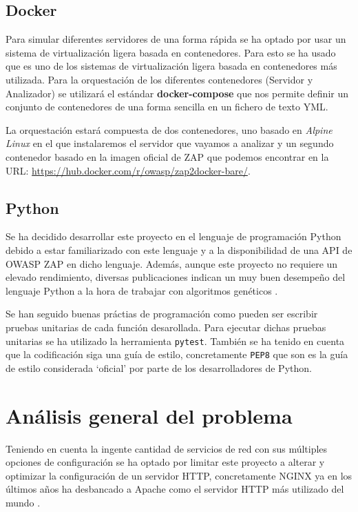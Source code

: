 \subsection{Docker}

Para simular diferentes servidores de una forma rápida se ha optado por usar un sistema de virtualización ligera basada en contenedores. Para esto se ha usado  que es uno de los sistemas de virtualización ligera basada en contenedores más utilizada. Para la orquestación de los diferentes contenedores (Servidor y Analizador) se utilizará el estándar \textbf{docker-compose} que nos permite definir un conjunto de contenedores de una forma sencilla en un fichero de texto YML.

\bigskip
La orquestación estará compuesta de dos contenedores, uno basado en \textit{Alpine Linux} en el que instalaremos el servidor que vayamos a analizar y un segundo contenedor basado en la imagen oficial de ZAP que podemos encontrar en la URL: \url{https://hub.docker.com/r/owasp/zap2docker-bare/}.

\subsection{Python}

Se ha decidido desarrollar este proyecto en el lenguaje de programación Python debido a estar familiarizado con este lenguaje y a la disponibilidad de una API de OWASP ZAP en dicho lenguaje. Además, aunque este proyecto no requiere un elevado rendimiento, diversas publicaciones indican un muy buen desempeño del lenguaje Python a la hora de trabajar con algoritmos genéticos \cite{merelo-guervos_comparison_2016}.

\bigskip
Se han seguido buenas práctias de programación como pueden ser escribir pruebas unitarias de cada función desarollada. Para ejecutar dichas pruebas unitarias se ha utilizado la herramienta \texttt{pytest}. También se ha tenido en cuenta que la codificación siga una guía de estilo, concretamente \texttt{PEP8} que son es la guía de estilo considerada `oficial' por parte de los desarrolladores de Python.

\section{Análisis general del problema}

Teniendo en cuenta la ingente cantidad de servicios de red con sus múltiples opciones de configuración se ha optado por limitar este proyecto a alterar y optimizar la configuración de un servidor HTTP, concretamente NGINX ya en los últimos años ha desbancado a Apache como el servidor HTTP  más utilizado del mundo \cite{w3techs_usage_2019}.

